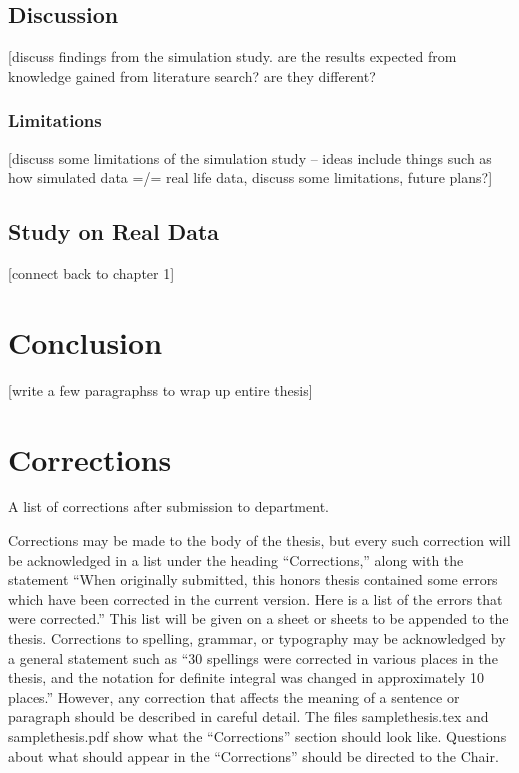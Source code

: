 \documentclass[12pt, twoside]{amherstthesis}
\begin{document}
\hypertarget{discussion}{%
\section{Discussion}\label{discussion}}

{[}discuss findings from the simulation study. are the results expected from knowledge gained from literature search? are they different?

\hypertarget{limitations}{%
\subsection{Limitations}\label{limitations}}

{[}discuss some limitations of the simulation study -- ideas include things such as how simulated data =/= real life data, discuss some limitations, future plans?{]}

\hypertarget{real_data}{%
\section{Study on Real Data}\label{real_data}}

{[}connect back to chapter 1{]}

\hypertarget{conclusion}{%
\chapter{Conclusion}\label{conclusion}}

{[}write a few paragraphss to wrap up entire thesis{]}

\hypertarget{corrections}{%
\chapter*{Corrections}\label{corrections}}

A list of corrections after submission to department.

Corrections may be made to the body of the thesis, but every such correction will be acknowledged in a list under the heading ``Corrections,'' along with the statement ``When originally submitted, this honors thesis contained some errors which have been corrected in the current version. Here is a list of the errors that were corrected.'' This list will be given on a sheet or sheets to be appended to the thesis. Corrections to spelling, grammar, or typography may be acknowledged by a general statement such as ``30 spellings were corrected in various places in the thesis, and the notation for definite integral was changed in approximately 10 places.'' However, any correction that affects the meaning of a sentence or paragraph should be described in careful detail. The files samplethesis.tex and samplethesis.pdf show what the ``Corrections'' section should look like. Questions about what should appear in the ``Corrections'' should be directed to the Chair.
\end{document}
